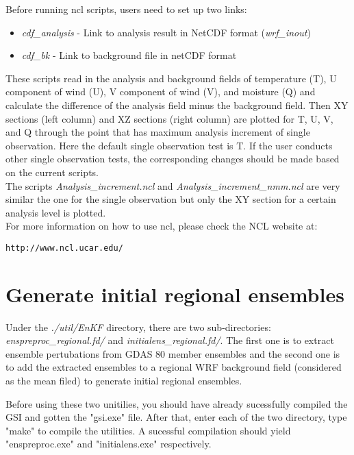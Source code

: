 Before running ncl scripts, users need to set up two links:
\begin{itemize}
\item \textit{cdf\_analysis}  - Link to analysis result in NetCDF format (\textit{wrf\_inout})
\item \textit{cdf\_bk} - Link to background file in netCDF format
\end{itemize}
These scripts read in the analysis and background fields of temperature (T), U component of wind (U), V component of wind (V), and moisture (Q) and calculate the difference of the analysis field minus the background field. Then XY sections (left column) and XZ sections (right column) are plotted for T, U, V, and Q through the point that has maximum analysis increment of single observation. Here the default single observation test is T. If the user conducts other single observation tests, the corresponding changes should be made based on the current scripts.\\

The scripts \textit{Analysis\_increment.ncl} and \textit{Analysis\_increment\_nmm.ncl} are very similar the one for the single observation but only the XY section for a certain analysis level is plotted.\\

For more information on how to use ncl, please check the NCL website at:
\begin{scriptsize}
\begin{verbatim}  
http://www.ncl.ucar.edu/
\end{verbatim}
\end{scriptsize}

 
\section{Generate initial regional ensembles }

Under the \textit{./util/EnKF} directory, there are two sub-directories:\textit{ enspreproc\_regional.fd/} and \textit{initialens\_regional.fd/}. The first one is to extract ensemble pertubations from GDAS 80 member ensembles and the second one is to add the extracted ensembles to a regional WRF background field (considered as the mean filed) to generate initial regional ensembles.

Before using these two unitilies, you should have already sucessfully compiled the GSI and gotten the "gsi.exe" file. After that, enter each of the two directory, type "make" to compile the utilities. A sucessful compilation should yield "enspreproc.exe" and "initialens.exe" respectively.

